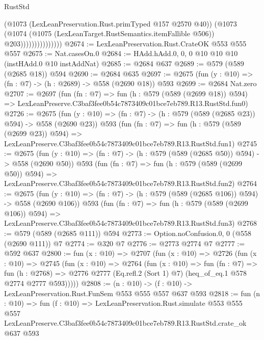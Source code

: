 \begin{lexlean}{RustStd}
\begin{coremodule}
                              (@1073 (LexLeanPreservation.Rust.primTyped @157 @2570 @40))
                              (@1073
                                (@1074
                                  (@1075 (LexLeanTarget.RustSemantics.itemFallible @506))
                                  @203)))))))))))))))
@2674 := LexLeanPreservation.Rust.CrateOK @553 @555 @557
@2675 := Nat.casesOn.{0}
@2684 := HAdd.hAdd.{0, 0, 0} @10 @10 @10 (instHAdd.{0} @10 instAddNat)
@2685 := @2684 @637
@2689 := @579 (@589 (@2685 @18)) @594
@2690 := @2684 @635
@2697 := @2675 (fun (y : @10) => (fn : @7) -> (h : @2689) -> @558 (@2690 @18)) @593
@2699 := @2684 Nat.zero
@2707 := @2697
    (fun (fn : @7) =>
    fun (h : @579 (@589 (@2699 @18)) @594) =>
    LexLeanPreserve.C3baf3fee0b54c7873409c01bce7eb789.R13.RustStd.fun0)
@2726 := @2675
    (fun (y : @10) => (fn : @7) -> (h : @579 (@589 (@2685 @23)) @594) -> @558 (@2690 @23))
    @593
    (fun (fn : @7) =>
    fun (h : @579 (@589 (@2699 @23)) @594) =>
    LexLeanPreserve.C3baf3fee0b54c7873409c01bce7eb789.R13.RustStd.fun1)
@2745 := @2675
    (fun (y : @10) => (fn : @7) -> (h : @579 (@589 (@2685 @50)) @594) -> @558 (@2690 @50))
    @593
    (fun (fn : @7) =>
    fun (h : @579 (@589 (@2699 @50)) @594) =>
    LexLeanPreserve.C3baf3fee0b54c7873409c01bce7eb789.R13.RustStd.fun2)
@2764 := @2675
    (fun (y : @10) => (fn : @7) -> (h : @579 (@589 (@2685 @106)) @594) -> @558 (@2690 @106))
    @593
    (fun (fn : @7) =>
    fun (h : @579 (@589 (@2699 @106)) @594) =>
    LexLeanPreserve.C3baf3fee0b54c7873409c01bce7eb789.R13.RustStd.fun3)
@2768 := @579 (@589 (@2685 @111)) @594
@2773 := Option.noConfusion.{0, 0} (@558 (@2690 @111)) @7
@2774 := @320 @7
@2776 := @2773 @2774 @7
@2777 := @592 @637
@2800 := fun (x : @10) =>
  @2707
    (fun (x : @10) =>
    @2726
      (fun (x : @10) =>
      @2745
        (fun (x : @10) =>
        @2764
          (fun (x : @10) =>
          fun (fn : @7) =>
          fun (h : @2768) =>
          @2776 @2777 (Eq.refl.{2} (Sort 1) @7) (heq_of_eq.{1} @578 @2774 @2777 @593)))))
@2808 := (n : @10) -> (f : @10) -> LexLeanPreservation.Rust.FunSem @553 @555 @557 @637 @593
@2818 := fun (n : @10) =>
  fun (f : @10) =>
  LexLeanPreservation.Rust.simulate
    @553
    @555
    @557
    LexLeanPreserve.C3baf3fee0b54c7873409c01bce7eb789.R13.RustStd.crate_ok
    @637
    @593
\end{coremodule}
\end{lexlean}
